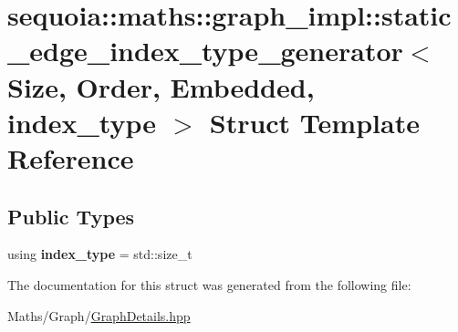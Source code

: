 \hypertarget{structsequoia_1_1maths_1_1graph__impl_1_1static__edge__index__type__generator}{}\section{sequoia\+::maths\+::graph\+\_\+impl\+::static\+\_\+edge\+\_\+index\+\_\+type\+\_\+generator$<$ Size, Order, Embedded, index\+\_\+type $>$ Struct Template Reference}
\label{structsequoia_1_1maths_1_1graph__impl_1_1static__edge__index__type__generator}
\subsection*{Public Types}
\begin{DoxyCompactItemize}
\item 
\mbox{\label{structsequoia_1_1maths_1_1graph__impl_1_1static__edge__index__type__generator_ac96bb4eb111d5c189c09b464d9703f70}} 
using {\bfseries index\+\_\+type} = std\+::size\+\_\+t
\end{DoxyCompactItemize}


The documentation for this struct was generated from the following file\+:\begin{DoxyCompactItemize}
\item 
Maths/\+Graph/\mbox{\hyperlink{_graph_details_8hpp}{Graph\+Details.\+hpp}}\end{DoxyCompactItemize}
